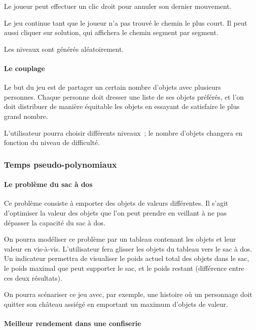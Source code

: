 \documentclass[12pt]{report}
\begin{document}
  Le joueur peut effectuer un clic droit pour annuler son dernier
   mouvement.
  
  Le jeu continue tant que le joueur n'a pas trouvé le chemin
   le plus court. Il peut aussi cliquer sur \og solution\fg, qui
   affichera le chemin segment par segment.
  
  Les niveaux sont générés aléatoirement.
  
  \paragraph{Le couplage}
  
  Le but du jeu est de partager un certain nombre d'objets avec plusieurs
   personnes. Chaque personne doit dresser une liste de ses objets préférés,
   et l'on doit distribuer de manière équitable les objets en essayant de
   satisfaire le plus grand nombre.

  L'utilisateur pourra choisir différents niveaux~; le nombre d'objets
   changera en fonction du niveau de difficulté.

  \subsubsection{Temps pseudo-polynomiaux}
  
  \paragraph{Le problème du sac à dos}
  
  Ce problème consiste à emporter des objets de valeurs différentes. Il s'agit
   d'optimiser la valeur des objets que l'on peut prendre en veillant à ne pas
   dépasser la capacité du sac à dos.

  On pourra modéliser ce problème par un tableau contenant les objets et leur
   valeur en vis-à-vis. L'utilisateur fera glisser les objets du tableau vers
   le sac à dos. Un indicateur permettra de visualiser le poids actuel total
   des objets dans le sac, le poids maximal que peut supporter le sac, et le
   poids restant (différence entre ces deux résultats).

  On pourra scénariser ce jeu avec, par exemple, une histoire où un personnage
   doit quitter son château assiégé en emportant un maximum d'objets de valeur.

  \paragraph{Meilleur rendement dans une confiserie}
  
\end{document}
